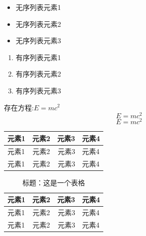\documentclass[UTF8]{ctexart}
\begin{document}
\begin{itemize}%
    \item 无序列表元素1
    \item 无序列表元素2
    \item 无序列表元素3
\end{itemize}

\begin{enumerate}
    \item 有序列表元素1
    \item 有序列表元素2
    \item 有序列表元素3
\end{enumerate}

存在方程:$E=mc^2$
\begin{equation}
    E=mc^2
\end{equation}%
\[
    E=mc^2
\]
\begin{tabular}{|l|c|r|p{2cm}|}%
    \hline%
    元素1 & 元素2 & 元素3 & 元素4 \\
    \hline\hline%
    元素1 & 元素2 & 元素3 & 元素4 \\
    \hline
    元素1 & 元素2 & 元素3 & 元素4 \\
    \hline
\end{tabular}
\begin{table}%
    \center
    \begin{tabular}{|l|c|r|p{2cm}|}%
        \hline%
        元素1 & 元素2 & 元素3 & 元素4 \\
        \hline\hline%
        元素1 & 元素2 & 元素3 & 元素4 \\
        \hline
        元素1 & 元素2 & 元素3 & 元素4 \\
        \hline
    \end{tabular}
    \caption{标题：这是一个表格}
\end{table}
\end{document}
